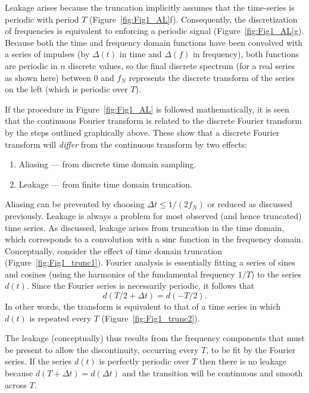 Leakage arises because the truncation implicitly 
assumes that the time-series is periodic with period $T$ (Figure~\ref{fig:Fig1_AL}f).  Consequently, the
discretization of frequencies is equivalent to enforcing a periodic signal (Figure~\ref{fig:Fig1_AL}g).
Because both the time and frequency domain functions have been convolved with a series of 
impulses (by $\Delta(t)$ in time and $\Delta(f)$ in frequency), both functions are periodic in $n$ discrete values, so 
the final discrete spectrum  (for a real series as shown here) between $0$ and $f_N$ represents the 
discrete transform of the series on the left (which is periodic over $T$).

	If the procedure in Figure~\ref{fig:Fig1_AL} is followed mathematically, it is seen that the continuous Fourier 
transform is related to the discrete Fourier transform by the steps outlined graphically above.  
These show that a discrete Fourier transform will \emph{differ} from the continuous transform by two effects:
\begin{enumerate}
\item Aliasing --- from discrete time domain sampling.
\item Leakage --- from finite time domain truncation.
\end{enumerate}
Aliasing can be prevented by choosing $\Delta t \leq 1/(2 f_N)$ or reduced as discussed previously.  Leakage is 
always a problem for most observed (and hence truncated) time series.
As discussed, leakage arises from truncation in the time domain, which corresponds to a 
convolution with a $\operatorname{sinc}$ function in the frequency domain.  Conceptually, consider the effect of time domain 
truncation (Figure~\ref{fig:Fig1_trunc1}).
Fourier analysis is essentially fitting a series of sines and cosines (using the harmonics of the 
fundamental frequency $1/T$) to the series $d(t)$.  Since the Fourier series is necessarily periodic, it 
follows that
\begin{equation}
d(T/2 + \Delta t) = d( - T/2).
\end{equation}
In other words, the transform is equivalent to that of a time series in which $d(t)$ is repeated every $T$ (Figure~\ref{fig:Fig1_trunc2}).
 
\noindent
The leakage (conceptually) thus results from the frequency components that must be present to 
allow the discontinuity, occurring every $T$, to be fit by the Fourier series.  If the series $d(t)$ 
is perfectly periodic over $T$ then there is no leakage because $d(T + \Delta t) = d(\Delta t)$ and the transition will be 
continuous and smooth across $T$. 

